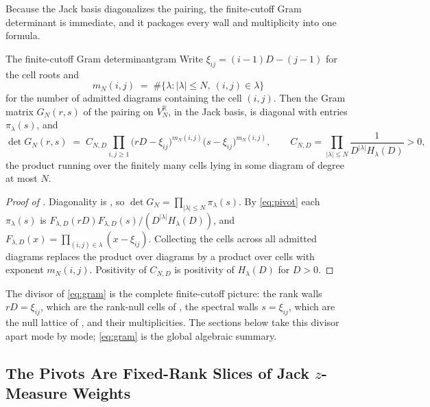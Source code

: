 \documentclass[11pt,letterpaper]{article}
\newcommand{\Rr}{\mathbb{R}}
\begin{document}
Because the Jack basis diagonalizes the pairing, the finite-cutoff Gram
determinant is immediate, and it packages every wall and multiplicity into one
formula.

\begin{proposition}{The finite-cutoff Gram determinant}{gram}
Write $\xi_{ij}=(i-1)D-(j-1)$ for the cell roots and
\begin{equation}
  m_N(i,j)\;=\;\#\bigl\{\lambda:\lvert\lambda\rvert\le N,\ (i,j)\in\lambda\bigr\}
  \label{eq:cellmult}
\end{equation}
for the number of admitted diagrams containing the cell $(i,j)$. Then the Gram
matrix $G_N(r,s)$ of the pairing on $V_N^{\Rr}$, in the Jack basis, is diagonal with
entries $\pi_\lambda(s)$, and
\begin{equation}
  \det G_N(r,s)\;=\;C_{N,D}
  \prod_{i,j\ge1}\bigl(rD-\xi_{ij}\bigr)^{m_N(i,j)}\bigl(s-\xi_{ij}\bigr)^{m_N(i,j)},
  \qquad
  C_{N,D}=\prod_{\lvert\lambda\rvert\le N}\frac{1}{D^{\lvert\lambda\rvert}H_\lambda(D)}>0,
  \label{eq:gram}
\end{equation}
the product running over the finitely many cells lying in some diagram of degree
at most $N$.
\end{proposition}

\begin{proof}[Proof of ]
Diagonality is , so $\det G_N=\prod_{|\lambda|\le N}\pi_\lambda(s)$.
By \eqref{eq:pivot} each $\pi_\lambda(s)$ is
$F_{\lambda,D}(rD)F_{\lambda,D}(s)/(D^{|\lambda|}H_\lambda(D))$, and
$F_{\lambda,D}(x)=\prod_{(i,j)\in\lambda}(x-\xi_{ij})$. Collecting the cells
across all admitted diagrams replaces the product over diagrams by a product over
cells with exponent $m_N(i,j)$. Positivity of $C_{N,D}$ is positivity of
$H_\lambda(D)$ for $D>0$.
\end{proof}

The divisor of \eqref{eq:gram} is the complete finite-cutoff picture: the rank
walls $rD=\xi_{ij}$, which are the rank-null cells of , the
spectral walls $s=\xi_{ij}$, which are the null lattice of , and
their multiplicities. The sections below take this divisor apart mode by mode;
\eqref{eq:gram} is the global algebraic summary.

\subsection{The Pivots Are Fixed-Rank Slices of Jack \texorpdfstring{$z$}{z}-Measure Weights}
\label{sec:zmeasures}
\end{document}
